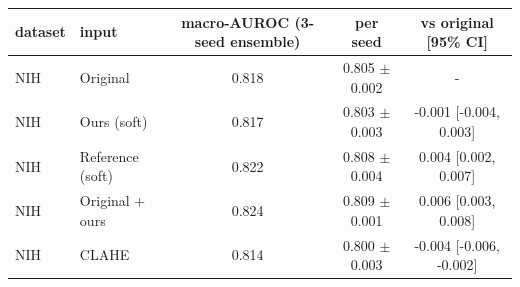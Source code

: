 \begin{tabular}{llccc}
\toprule
dataset & input & macro-AUROC (3-seed ensemble) & per seed & vs original [95\% CI] \\
\midrule
NIH & Original & 0.818 & 0.805 $\pm$ 0.002 & - \\
NIH & Ours (soft) & 0.817 & 0.803 $\pm$ 0.003 & -0.001 [-0.004, 0.003] \\
NIH & Reference (soft) & 0.822 & 0.808 $\pm$ 0.004 & 0.004 [0.002, 0.007] \\
NIH & Original + ours & 0.824 & 0.809 $\pm$ 0.001 & 0.006 [0.003, 0.008] \\
NIH & CLAHE & 0.814 & 0.800 $\pm$ 0.003 & -0.004 [-0.006, -0.002] \\
\bottomrule
\end{tabular}
